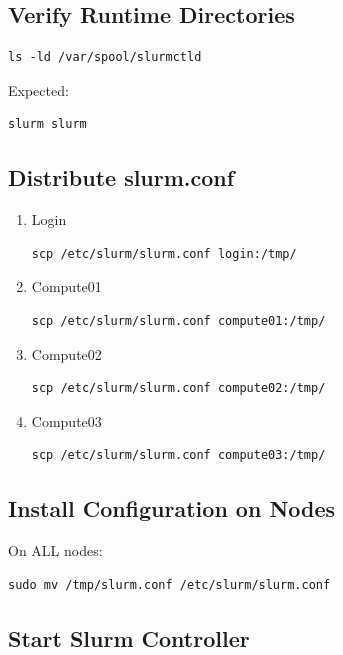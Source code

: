 \documentclass[11pt]{article}
\begin{document}
\subsection{Verify Runtime Directories}
\label{sec:orga1ed69a}

\begin{verbatim}
ls -ld /var/spool/slurmctld
\end{verbatim}

Expected:

\begin{verbatim}
slurm slurm
\end{verbatim}
\subsection{Distribute slurm.conf}
\label{sec:orgfb197dc}
\begin{enumerate}
\item Login
\label{sec:orgc606672}

\begin{verbatim}
scp /etc/slurm/slurm.conf login:/tmp/
\end{verbatim}
\item Compute01
\label{sec:org38e5e53}

\begin{verbatim}
scp /etc/slurm/slurm.conf compute01:/tmp/
\end{verbatim}
\item Compute02
\label{sec:org5338fa3}

\begin{verbatim}
scp /etc/slurm/slurm.conf compute02:/tmp/
\end{verbatim}
\item Compute03
\label{sec:orgf846e5a}

\begin{verbatim}
scp /etc/slurm/slurm.conf compute03:/tmp/
\end{verbatim}
\end{enumerate}
\subsection{Install Configuration on Nodes}
\label{sec:orga549d1c}

On ALL nodes:

\begin{verbatim}
sudo mv /tmp/slurm.conf /etc/slurm/slurm.conf
\end{verbatim}
\subsection{Start Slurm Controller}
\label{sec:org109d402}
\end{document}
